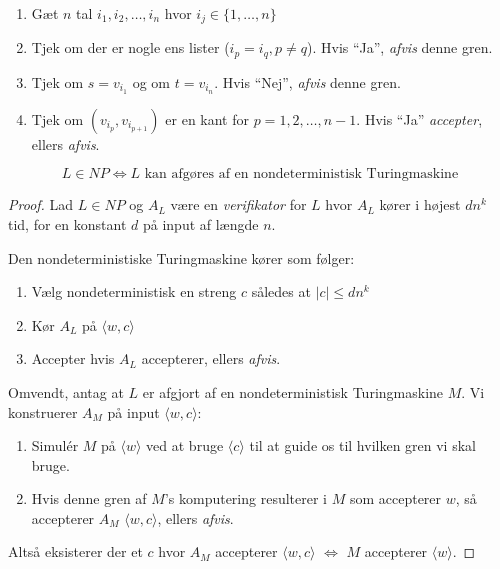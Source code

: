 \begin{enumerate}
	\item Gæt $n$ tal $i_{1}, i_{2}, \ldots, i_{n}$ hvor $i_{j} \in \{1, \ldots, n\}$
	\item Tjek om der er nogle ens lister ($i_{p} = i_{q}, p \ne q$). Hvis ``Ja'', \textit{afvis} denne gren.
	\item Tjek om $s = v_{i_{1}}$ og om $t = v_{i_{n}}$. Hvis ``Nej'', \textit{afvis} denne gren.
	\item Tjek om $(v_{i_{p}},v_{i_{p+1}})$ er en kant for $p = 1,2, \ldots, n-1$. Hvis ``Ja'' \textit{accepter}, ellers \textit{afvis}.
\end{enumerate}

\begin{theorem}
	\begin{equation}
		L \in NP \iff L \text{ kan afgøres af en nondeterministisk Turingmaskine}
	\end{equation}
\end{theorem}

\begin{proof}
	Lad $L \in NP$ og $A_{L}$ være en \textit{verifikator} for $L$ hvor $A_{L}$ kører i højest $dn^{k}$ tid, for en konstant $d$ på input af længde $n$.

	Den nondeterministiske Turingmaskine kører som følger:
	\begin{enumerate}
		\item Vælg nondeterministisk en streng $c$ således at $|c| \le dn^{k}$
		\item Kør $A_{L}$ på \(\langle w, c \rangle \)
		\item Accepter hvis $A_{L}$ accepterer, ellers \textit{afvis}.
	\end{enumerate}

	Omvendt, antag at $L$ er afgjort af en nondeterministisk Turingmaskine $M$. Vi konstruerer $A_{M}$ på input \(\langle w, c \rangle \):
	\begin{enumerate}
		\item Simulér $M$ på \(\langle w \rangle  \) ved at bruge \( \langle c \rangle \) til at guide os til hvilken gren vi skal bruge.
		\item Hvis denne gren af $M$'s komputering resulterer i $M$ som accepterer $w$, så accepterer $A_{M}$ \(\langle w , c \rangle \), ellers \textit{afvis}.
	\end{enumerate}

	Altså eksisterer der et $c$ hvor $A_{M}$ accepterer \( \langle w , c \rangle \) $\iff$ $M$ accepterer $\langle w \rangle $.
\end{proof}

